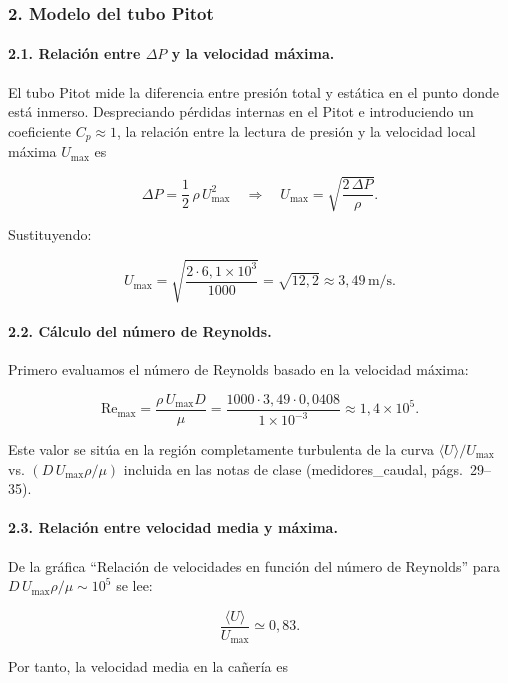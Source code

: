 \documentclass[12pt, a4paper]{article}
\begin{document}
\subsubsection*{2. Modelo del tubo Pitot}

\paragraph{2.1. Relación entre $\Delta P$ y la velocidad máxima.}

El tubo Pitot mide la diferencia entre presión total y estática en el punto
donde está inmerso. Despreciando pérdidas internas en el Pitot e introduciendo
un coeficiente $C_p \approx 1$, la relación entre la lectura de presión
y la velocidad local máxima $U_{\max}$ es

\[
\Delta P = \frac{1}{2}\,\rho\,U_{\max}^2
\quad\Longrightarrow\quad
U_{\max} = \sqrt{\frac{2\,\Delta P}{\rho}}.
\]

Sustituyendo:

\[
U_{\max}
= \sqrt{\frac{2\cdot 6{,}1\times 10^3}{1000}}
= \sqrt{12{,}2}
\approx 3{,}49\,\text{m/s}.
\]

\paragraph{2.2. Cálculo del número de Reynolds.}

Primero evaluamos el número de Reynolds basado en la velocidad máxima:

\[
\mathrm{Re}_{\max}
= \frac{\rho\,U_{\max} D}{\mu}
= \frac{1000\cdot 3{,}49\cdot 0{,}0408}{1\times 10^{-3}}
\approx 1{,}4\times 10^5.
\]

Este valor se sitúa en la región completamente turbulenta de la curva
$\langle U\rangle/U_{\max}$ vs. $(D\,U_{\max}\rho/\mu)$ incluida en las
notas de clase (medidores\_caudal, págs.~29--35).

\paragraph{2.3. Relación entre velocidad media y máxima.}

De la gráfica ``Relación de velocidades en función del número de Reynolds''
para $D\,U_{\max}\rho/\mu \sim 10^5$ se lee:

\[
\frac{\langle U\rangle}{U_{\max}} \simeq 0{,}83.
\]

Por tanto, la velocidad media en la cañería es
\end{document}
